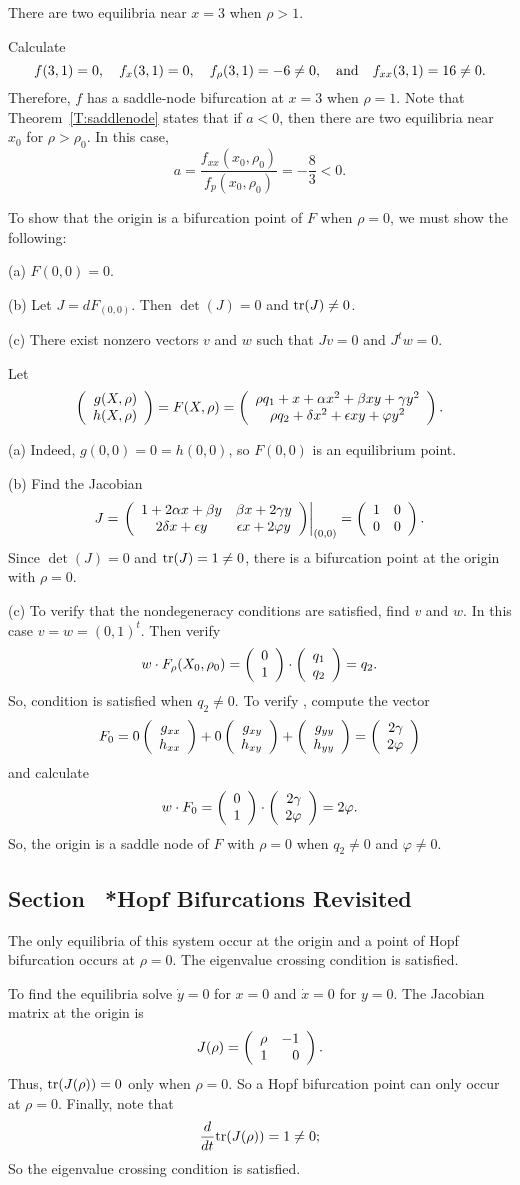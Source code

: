 \documentclass{ximera}
\begin{document}
\ans There are two equilibria near $x = 3$ when $\rho > 1$.

\soln Calculate
\[
f(3,1) = 0, \quad
f_x(3,1) = 0, \quad
f_\rho(3,1) = -6 \neq 0, \quad\mbox{and}\quad
f_{xx}(3,1) = 16 \neq 0.
\]
Therefore, $f$ has a saddle-node bifurcation at $x = 3$ when $\rho =
1$.  Note that Theorem~\ref{T:saddlenode} states
that if $a < 0$, then there are two equilibria near $x_0$ for $\rho >
\rho_0$.  In this case,
\[
a = \frac{f_{xx}(x_0,\rho_0)}{f_p(x_0,\rho_0)} = -\frac{8}{3} < 0.
\]

To show that the origin is a bifurcation point of $F$ when $\rho = 0$, we
must show the following:

(a) $F(0,0) = 0$.

(b) Let $J = dF_{(0,0)}$.  Then $\det(J) = 0$ and ${\rm tr}(J) \neq 0$.

(c) There exist nonzero vectors $v$ and $w$ such that $Jv = 0$ and
$J^tw = 0$.

\soln Let
\[
\left(\begin{array}{r} g(X,\rho) \\ h(X,\rho)\end{array}\right) = F(X,\rho) = 
\left(\begin{array}{c} \rho q_1 + x + \alpha x^2 + \beta xy + \gamma y^2 \\ \rho q_2 + \delta x^2 + \epsilon xy + \varphi y^2\end{array}\right).
\]

(a) Indeed, $g(0,0) = 0 = h(0,0)$, so $F(0,0)$ is an equilibrium point.

(b) Find the Jacobian
\[
J = \left.\left(\begin{array}{cc} 1 + 2\alpha x + \beta y & \beta x + 2\gamma y\\ 2\delta x + \epsilon y &\epsilon x + 2\varphi y\end{array}\right)\right|_{(0,0)} =
\left(\begin{array}{rr} 1 & 0\\ 0 &0\end{array}\right).
\]
Since $\det(J) = 0$ and ${\rm tr}(J) = 1 \neq 0$, there
is a bifurcation point at the origin with $\rho = 0$.

(c)  To verify that the nondegeneracy conditions are satisfied, find $v$
and $w$.  In this case $v = w = (0,1)^t$.  Then verify
\[
w \cdot F_\rho(X_0,\rho_0) = \left(\begin{array}{r} 0 \\ 1\end{array}\right) \cdot \left(\begin{array}{r} q_1 \\ q_2\end{array}\right)
= q_2.
\]
So, condition  is satisfied when $q_2 \neq 0$.  To
verify , compute the vector
\[
F_0 = 0\left(\begin{array}{r} g_{xx} \\ h_{xx}\end{array}\right) + 0\left(\begin{array}{r} g_{xy} \\ h_{xy}\end{array}\right) +
\left(\begin{array}{r} g_{yy} \\ h_{yy}\end{array}\right) = \left(\begin{array}{r} 2\gamma \\ 2\varphi\end{array}\right)
\]
and calculate
\[
w \cdot F_0 = \left(\begin{array}{r} 0 \\ 1\end{array}\right) \cdot \left(\begin{array}{r} 2\gamma \\ 2\varphi\end{array}\right)
= 2\varphi.
\]
So, the origin is a saddle node of $F$ with $\rho = 0$ when
$q_2 \neq 0$ and $\varphi \neq 0$.



\subsection*{Section~\protect{\ref{S:HopfBif}} *Hopf Bifurcations Revisited}

\ans The only equilibria of this system occur at the origin and a point of
Hopf bifurcation occurs at $\rho=0$.  The eigenvalue crossing condition is
satisfied.

\soln  To find the equilibria solve $\dot{y}=0$ for $x=0$ and $\dot{x}=0$ for
$y=0$.  The Jacobian matrix at the origin is 
\[
J(\rho) = \left(\begin{array}{rr} \rho & -1\\ 1 &0\end{array}\right).
\]
Thus, ${\rm tr}(J(\rho))=0$ only when $\rho=0$.  So a Hopf bifurcation point
can only occur at $\rho=0$.  Finally, note that 
\[
\frac{d}{dt}{\rm tr}(J(\rho)) = 1 \neq 0;
\]
So the eigenvalue crossing condition is satisfied.
\end{document}
